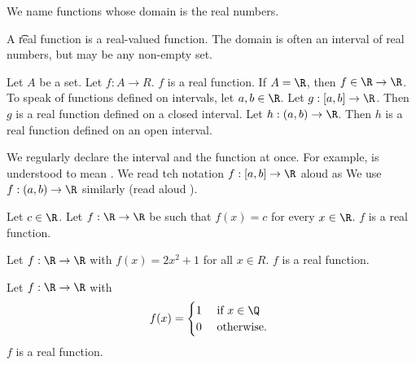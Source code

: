 

We name functions whose domain is the real numbers.


A \t{real function} is a real-valued function.
The domain is often an interval of real numbers, but may be any non-empty set.


Let $A$ be a set.
Let $f: A \to R$.
$f$ is a real function.
If $A = \R$, then $f \in \R \to \R$.
To speak of functions defined on intervals, let $a, b \in \R$.
Let $g: [a, b] \to \R$.
Then $g$ is a real function defined on a closed interval.
Let $h: (a, b) \to \R$.
Then $h$ is a real function defined on an open interval.

We regularly declare the interval and the function at once.
For example,
 is understood to mean .
We read teh notation $f: [a, b] \to \R$ aloud as 
We use $f: (a, b) \to \R$ similarly (read aloud ).


\begin{expl}
Let $c \in \R$.
Let $f: \R \to \R$ be such that
$f(x) = c$ for every $x \in \R$.
$f$ is a real function.
\end{expl}

\begin{expl}
\item Let $f: \R \to \R$ with $f(x) = 2x^2 + 1$ for all $x \in R$.
$f$ is a real function.
\end{expl}

\begin{expl}
  Let $f: \R \to \R$ with
  \[
    f(x) = \begin{cases}
      1 & \text{ if } x \in \Q \\
      0 & \text{ otherwise. }
    \end{cases}
  \]
$f$ is a real function.
\end{expl}

